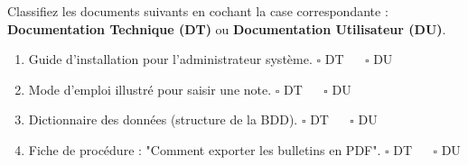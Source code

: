 \documentclass[11pt]{article}
\begin{document}
\begin{exercice}
\label{exo:doc}
Classifiez les documents suivants en cochant la case correspondante : \textbf{Documentation Technique (DT)} ou \textbf{Documentation Utilisateur (DU)}.
\begin{enumerate}
    \item Guide d'installation pour l'administrateur système. \hfill $\square$ DT $\quad$ $\square$ DU
    \item Mode d'emploi illustré pour saisir une note. \hfill $\square$ DT $\quad$ $\square$ DU
    \item Dictionnaire des données (structure de la BDD). \hfill $\square$ DT $\quad$ $\square$ DU
    \item Fiche de procédure : "Comment exporter les bulletins en PDF". \hfill $\square$ DT $\quad$ $\square$ DU
\end{enumerate}
\end{exercice}
\end{document}
